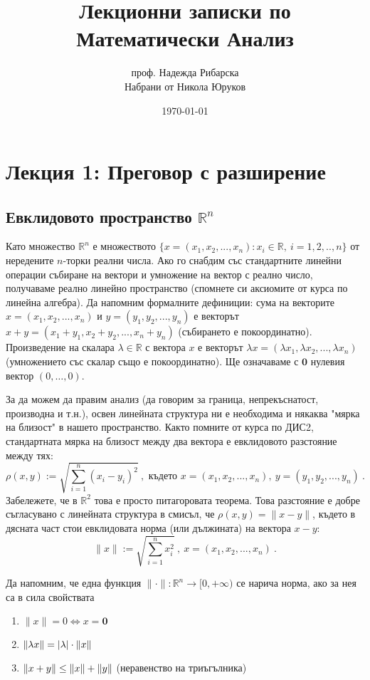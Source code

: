 \documentclass[11pt]{article}
\title{Лекционни записки по Математически Анализ}
\author{проф. Надежда Рибарска \\ Набрани от Никола Юруков}
\date{\today}
\numberwithin{equation}{section}
\numberwithin{figure}{section}
\numberwithin{table}{section}
\theoremstyle{plain}
\theoremstyle{definition}
\theoremstyle{remark}
\theoremstyle{definition}
\theoremstyle{remark}
\theoremstyle{plain}
\theoremstyle{definition}
\theoremstyle{definition}
\theoremstyle{plain}
\theoremstyle{plain}
\theoremstyle{plain}
\theoremstyle{definition}
\theoremstyle{plain}
\DeclarePairedDelimiter\norm{\lVert}{\rVert}
\renewcommand*{\Vec}[1]{\mathbf{#1}}
\newcommand*{\Z}{\Vec{0}}
\begin{document}
\maketitle

\clearpage

\tableofcontents

\clearpage

\section{Лекция 1: Преговор с разширение}

\subsection{Евклидовото пространство $\mathbb{R}^n$}

Като множество $\mathbb{R}^n$ е множеството $\{x = (x_1, x_2, ..., x_n): x_i \in \mathbb{R}, \  i=1,2,..,n\}$ от нередените $n$-торки реални числа. Ако го снабдим със стандартните линейни операции събиране на вектори и умножение на вектор с реално число, получаваме реално линейно пространство (спомнете си аксиомите от курса по линейна алгебра). Да напомним формалните дефиниции: сума на векторите $x = (x_1, x_2, ..., x_n)$ и $y = (y_1, y_2, ..., y_n)$ е векторът $x+y = (x_1+y_1, x_2+y_2, ..., x_n + y_n)$ (събирането е покоординатно). Произведение на скалара $\lambda \in \mathbb{R}$ с вектора $x$ е векторът $\lambda x = (\lambda x_1, \lambda x_2, ..., \lambda x_n)$ (умножението със скалар също е покоординатно). Ще означаваме с $\Z$ нулевия вектор $(0,\dots ,0)$.

За да можем да правим анализ (да говорим за граница, непрекъснатост, производна и т.н.), освен линейната структура ни е необходима и някаква "мярка на близост" в нашето пространство. Както помните от курса по ДИС2, стандартната мярка на близост  между два вектора е евклидовото разстояние между тях:
 $$\rho(x,y):= \sqrt{\sum_{i=1}^n (x_i-y_i)^2} \ , \mbox{ където } x = (x_1, x_2, ..., x_n), \ y = (y_1, y_2, ..., y_n) \ .$$
 Забележете, че в $\mathbb{R}^2$ това е просто питагоровата теорема. Това разстояние е добре съгласувано с линейната структура в смисъл, че $\rho(x,y)=\lVert x - y\rVert$, където в дясната част стои евклидовата норма (или дължината) на вектора $x-y$:
 $$\lVert x\rVert := \sqrt{\sum_{i=1}^n x_i^2}\ , \ x = (x_1, x_2, ..., x_n) \ .$$

 Да напомним, че една функция $\lVert \cdot \rVert :\mathbb{R}^n \longrightarrow [0,+\infty)$ се нарича норма, ако за нея са в сила свойствата
\begin{enumerate}
	\item $\lVert x \rVert = 0 \iff x=\Z$
	\item $\norm{\lambda x} = |\lambda|\cdot \norm{x}$
	\item $\norm{x+y} \leq \norm{x} + \norm{y}$ (неравенство на триъгълника)
\end{enumerate}
\end{document}
